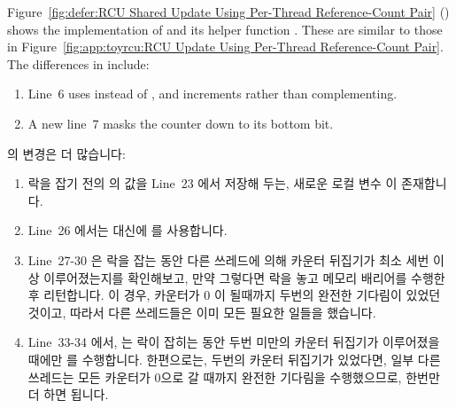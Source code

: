Figure~\ref{fig:defer:RCU Shared Update Using Per-Thread Reference-Count Pair}
()
shows the implementation of  and its helper
function .
These are similar to those in
Figure~\ref{fig:app:toyrcu:RCU Update Using Per-Thread Reference-Count Pair}.
The differences in  include:
\begin{enumerate}
\item	Line~6 uses  instead of ,
	and increments rather than complementing.
\item	A new line~7 masks the counter down to its bottom bit.
\end{enumerate}
\fi

 의 변경은 더 많습니다:
\begin{enumerate}
\item	락을 잡기 전의  의 값을 Line~23 에서 저장해 두는, 새로운
	로컬 변수  이 존재합니다.
\item	Line~26 에서는  대신에  를
	사용합니다.
\item	Line~27-30 은 락을 잡는 동안 다른 쓰레드에 의해 카운터 뒤집기가 최소
	세번 이상 이루어졌는지를 확인해보고, 만약 그렇다면 락을 놓고 메모리
	배리어를 수행한 후 리턴합니다.
	이 경우, 카운터가 0 이 될때까지 두번의 완전한 기다림이 있었던 것이고,
	따라서 다른 쓰레드들은 이미 모든 필요한 일들을 했습니다.
\item	Line~33-34 에서,  는 락이 잡히는 동안 두번
	미만의 카운터 뒤집기가 이루어졌을 때에만 
	를 수행합니다.
	한편으로는, 두번의 카운터 뒤집기가 있었다면, 일부 다른 쓰레드는 모든
	카운터가 0으로 갈 때까지 완전한 기다림을 수행했으므로, 한번만 더 하면
	됩니다.
\end{enumerate}
\iffalse

The changes to \co{synchronize_rcu()} are more pervasive:
\begin{enumerate}
\item	There is a new \co{oldctr} local variable that captures
	the pre-lock-acquisition value of \co{rcu_idx} on
	line~23.
\item	Line~26 uses \co{ACCESS_ONCE()} instead of \co{atomic_read()}.
\item	Lines~27-30 check to see if at least three counter flips were
	performed by other threads while the lock was being acquired,
	and, if so, releases the lock, does a memory barrier, and returns.
	In this case, there were two full waits for the counters to
	go to zero, so those other threads already did all the required work.
\item	At lines~33-34, \co{flip_counter_and_wait()} is only
	invoked a second time if there were fewer than two counter flips
	while the lock was being acquired.
	On the other hand, if there were two counter flips, some other
	thread did one full wait for all the counters to go to zero,
	so only one more is required.
\end{enumerate}
\fi

